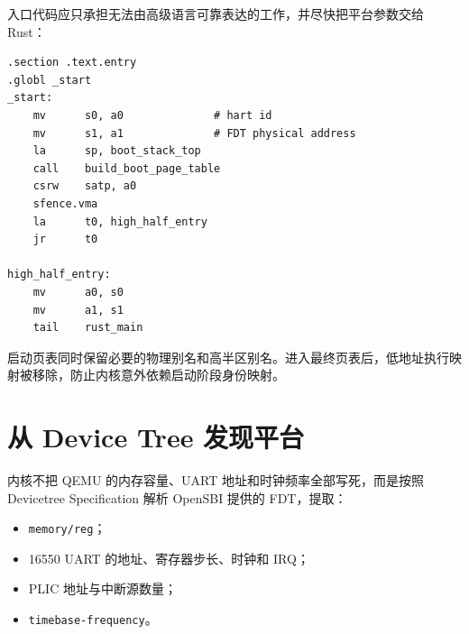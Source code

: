 入口代码应只承担无法由高级语言可靠表达的工作，并尽快把平台参数交给 Rust：

\begin{lstlisting}[language={[RISC-V]Assembler},caption={RISC-V S-mode 入口骨架（伪代码）}]
.section .text.entry
.globl _start
_start:
    mv      s0, a0              # hart id
    mv      s1, a1              # FDT physical address
    la      sp, boot_stack_top
    call    build_boot_page_table
    csrw    satp, a0
    sfence.vma
    la      t0, high_half_entry
    jr      t0

high_half_entry:
    mv      a0, s0
    mv      a1, s1
    tail    rust_main
\end{lstlisting}

\begin{center}
\end{center}

启动页表同时保留必要的物理别名和高半区别名。进入最终页表后，低地址执行映射被移除，防止内核意外依赖启动阶段身份映射。

\section{从 Device Tree 发现平台}

内核不把 QEMU 的内存容量、UART 地址和时钟频率全部写死，而是按照 Devicetree Specification 解析 OpenSBI 提供的 FDT\cite{devicetree-spec}，提取：
\begin{itemize}
  \item \texttt{memory/reg}；
  \item 16550 UART 的地址、寄存器步长、时钟和 IRQ；
  \item PLIC 地址与中断源数量；
  \item \texttt{timebase-frequency}。
\end{itemize}

